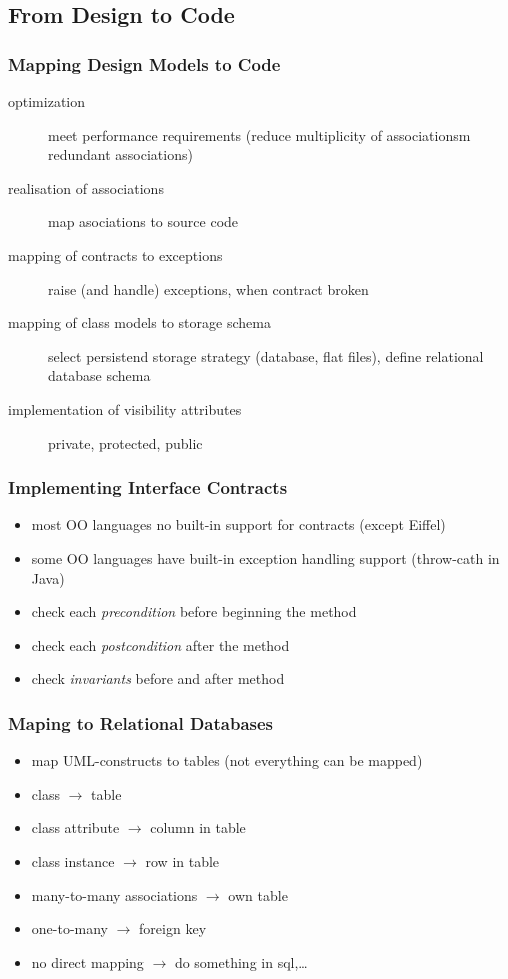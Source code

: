 \documentclass[a4paper, 10pt]{article}
\begin{document}
\subsection{From Design to Code}
\subsubsection{Mapping Design Models to Code}
\begin{description}
	\item[optimization] meet performance requirements (reduce multiplicity of associationsm redundant associations)
	\item[realisation of associations] map asociations to source code
	\item[mapping of contracts to exceptions] raise (and handle) exceptions, when contract broken
	\item[mapping of class models to storage schema] select persistend storage strategy (database, flat files), define relational database schema
	\item[implementation of visibility attributes] private, protected, public
\end{description}

\subsubsection{Implementing Interface Contracts}
\begin{itemize}
	\item most OO languages no built-in support for contracts (except Eiffel)
	\item some OO languages have built-in exception handling support (throw-cath in Java)
	\item check each \emph{precondition} before beginning the method
	\item check each \emph{postcondition} after the method
	\item check \emph{invariants} before and after method
\end{itemize}

\subsubsection{Maping to Relational Databases}
\begin{itemize}
	\item map UML-constructs to tables (not everything can be mapped)
	\item class $\to$ table
	\item class attribute $\to$ column in table
	\item class instance $\to$ row in table
	\item many-to-many associations $\to$ own table
	\item one-to-many $\to$ foreign key
	\item no direct mapping $\to$ do something in sql,\dots
\end{itemize}
\end{document}
